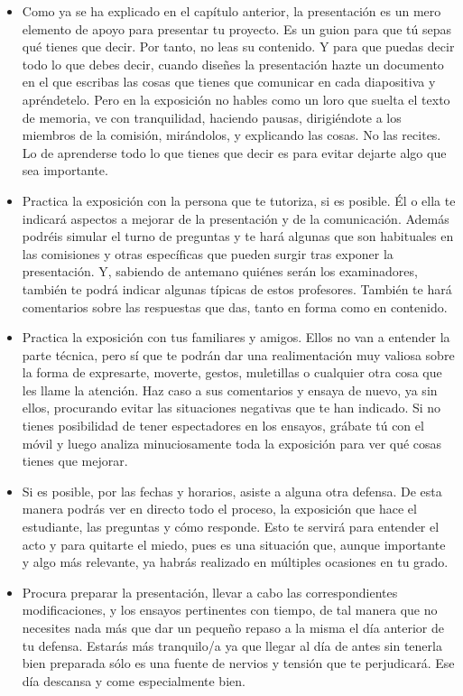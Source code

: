 \begin{itemize}
    \item Como ya se ha explicado en el capítulo anterior, la presentación es un mero elemento de apoyo para presentar tu proyecto. Es un guion para que tú sepas qué tienes que decir. Por tanto, no leas su contenido. Y para que puedas decir todo lo que debes decir, cuando diseñes la presentación hazte un documento en el que escribas las cosas que tienes que comunicar en cada diapositiva y apréndetelo. Pero en la exposición no hables como un loro que suelta el texto de memoria, ve con tranquilidad, haciendo pausas, dirigiéndote a los miembros de la comisión, mirándolos, y explicando las cosas. No las recites. Lo de aprenderse todo lo que tienes que decir es para evitar dejarte algo que sea importante. 

    \item Practica la exposición con la persona que te tutoriza, si es posible. Él o ella te indicará aspectos a mejorar de la presentación y de la comunicación. Además podréis simular el turno de preguntas y te hará algunas que son habituales en las comisiones y otras específicas que pueden surgir tras exponer la presentación. Y, sabiendo de antemano quiénes serán los examinadores, también te podrá indicar algunas típicas de estos profesores. También te hará comentarios sobre las respuestas que das, tanto en forma como en contenido.

    \item Practica la exposición con tus familiares y amigos. Ellos no van a entender la parte técnica, pero sí que te podrán dar una realimentación muy valiosa sobre la forma de expresarte, moverte, gestos, muletillas o cualquier otra cosa que les llame la atención. Haz caso a sus comentarios y ensaya de nuevo, ya sin ellos, procurando evitar las situaciones negativas que te han indicado. Si no tienes posibilidad de tener espectadores en los ensayos, grábate tú con el móvil y luego analiza minuciosamente toda la exposición para ver qué cosas tienes que mejorar.

    \item Si es posible, por las fechas y horarios, asiste a alguna otra defensa. De esta manera podrás ver en directo todo el proceso, la exposición que hace el estudiante, las preguntas y cómo responde. Esto te servirá para entender el acto y para quitarte el miedo, pues es una situación que, aunque importante y algo más relevante, ya habrás realizado en múltiples ocasiones en tu grado.

    \item Procura preparar la presentación, llevar a cabo las correspondientes modificaciones, y los ensayos pertinentes con tiempo, de tal manera que no necesites nada más que dar un pequeño repaso a la misma el día anterior de tu defensa. Estarás más tranquilo/a ya que llegar al día de antes sin tenerla bien preparada sólo es una fuente de nervios y tensión que te perjudicará. Ese día descansa y come especialmente bien. 
    
\end{itemize}


